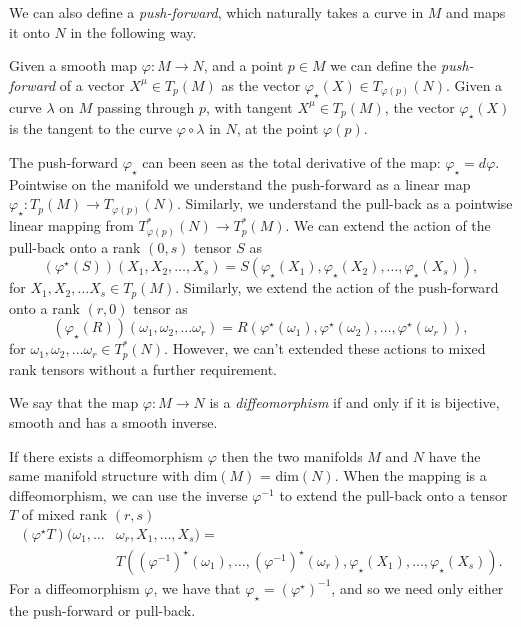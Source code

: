 We can also define a \emph{push-forward}, which naturally takes a curve in $M$ and maps it onto $N$ in the following way.
\begin{defn}
	Given a smooth map $\varphi: M \rightarrow N$, and a point $p \in M$ we can define the \emph{push-forward} of a vector $X^\mu \in T_p (M)$ as the vector $\varphi_\star(X) \in T_{\varphi(p)} (N)$. Given a curve $\lambda$ on $M$ passing through $p$, with tangent $X^\mu \in T_p (M)$, the vector $\varphi_\star(X)$ is the tangent to the curve $\varphi \circ \lambda$ in $N$, at the point $\varphi(p)$.
\end{defn}
The push-forward $\varphi_\star$ can been seen as the total derivative of the map: $\varphi_\star = d\varphi$. Pointwise on the manifold we understand the push-forward as a linear map $\varphi_\star: T_p(M) \rightarrow T_{\varphi(p)} (N)$. Similarly, we understand the pull-back as a pointwise linear mapping from $T^*_{\varphi(p)}(N) \rightarrow T^*_p(M)$. We can extend the action of the pull-back onto a rank $(0,s)$ tensor $S$ as
\begin{equation*}
  (\varphi^\star (S)) (X_1,X_2,\ldots, X_s) = S(\varphi_\star (X_1), \varphi_\star (X_2), \ldots, \varphi_\star (X_s)),
\end{equation*}
for $X_1,X_2,\ldots X_s \in T_p(M)$. Similarly, we extend the action of the push-forward onto a rank $(r,0)$ tensor as
\begin{equation*}
  (\varphi_\star (R)) (\omega_1,\omega_2,\ldots \omega_r) = R(\varphi^\star (\omega_1), \varphi^\star (\omega_2), \ldots, \varphi^\star (\omega_r)),
\end{equation*}
for $\omega_1,\omega_2,\ldots \omega_r \in T^*_p(N)$. However, we can't extended these actions to mixed rank tensors without a further requirement.
\begin{defn}
	We say that the map $\varphi : M \rightarrow N$ is a \emph{diffeomorphism} if and only if it is bijective, smooth and has a smooth inverse.
\end{defn}
If there exists a diffeomorphism $\varphi$ then the two manifolds $M$ and $N$ have the same manifold structure with dim$(M)$ = dim$(N)$. When the mapping is a diffeomorphism, we can use the inverse $\varphi^{-1}$ to extend the pull-back onto a tensor $T$ of mixed rank $(r,s)$ 
\begin{equation*}
\begin{aligned}
	  (\varphi^\star T) (\omega_1,\ldots &\omega_r, X_1,\ldots, X_s) = \\
	  &T ((\varphi^{-1})^\star (\omega_1), \ldots, (\varphi^{-1})^\star (\omega_r), \varphi_\star (X_1), \ldots, \varphi_\star (X_s)). 
\end{aligned}
\end{equation*}
For a diffeomorphism $\varphi$, we have that $\varphi_\star = (\varphi^\star)^{-1}$, and so we need only either the push-forward or pull-back.

